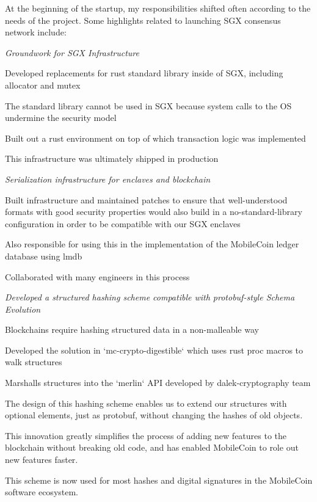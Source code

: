 \documentclass[margin,line]{resume}
\begin{document}
\begin{resume}
    At the beginning of the startup, my responsibilities shifted often according to the needs of the project.
    Some highlights related to launching SGX consensus network include:

    \textsl{Groundwork for SGX Infrastructure}
    \begin{list2}
    \item{Developed replacements for rust standard library inside of SGX, including allocator and mutex}
    \item{The standard library cannot be used in SGX because system calls to the OS undermine the security model}
    \item{Built out a rust environment on top of which transaction logic was implemented}
    \item{This infrastructure was ultimately shipped in production}
    \end{list2}

    \textsl{Serialization infrastructure for enclaves and blockchain}
    \begin{list2}
    \item{Built infrastructure and maintained patches to ensure that well-understood formats
    with good security properties would also build in a no-standard-library configuration
    in order to be compatible with our SGX enclaves}
    \item{Also responsible for using this in the implementation of the MobileCoin ledger database using lmdb}
    \item{Collaborated with many engineers in this process}
    \end{list2}

    \textsl{Developed a structured hashing scheme compatible with protobuf-style Schema Evolution}
    \begin{list2}
    \item{Blockchains require hashing structured data in a non-malleable way}
    \item{Developed the solution in `mc-crypto-digestible` which uses rust proc macros to walk structures}
    \item{Marshalls structures into the `merlin` API developed by dalek-cryptography team}
    \item{The design of this hashing scheme enables us to extend our structures with optional elements, just as protobuf,
          without changing the hashes of old objects.}
    \item{This innovation greatly simplifies the process of adding new features to the blockchain without breaking old code,
          and has enabled MobileCoin to role out new features faster.}
    \item{This scheme is now used for most hashes and digital signatures in the MobileCoin software ecosystem.}
    \end{list2}


\end{resume}
\end{document}
